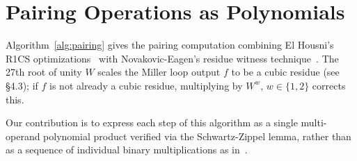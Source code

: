 \section{Pairing Operations as Polynomials}

Algorithm~\ref{alg:pairing} gives the pairing computation combining El Housni's R1CS optimizations~\cite{PR1CS22} with Novakovic-Eagen's residue witness technique~\cite{OPP24}. The 27th root of unity $W$ scales the Miller loop output $f$ to be a cubic residue (see~\cite{OPP24} §4.3); if $f$ is not already a cubic residue, multiplying by $W^w$, $w\in\{1,2\}$ corrects this.

Our contribution is to express each step of this algorithm as a single multi-operand polynomial product verified via the Schwartz-Zippel lemma, rather than as a sequence of individual binary multiplications as in~\cite{FXFM23}.


